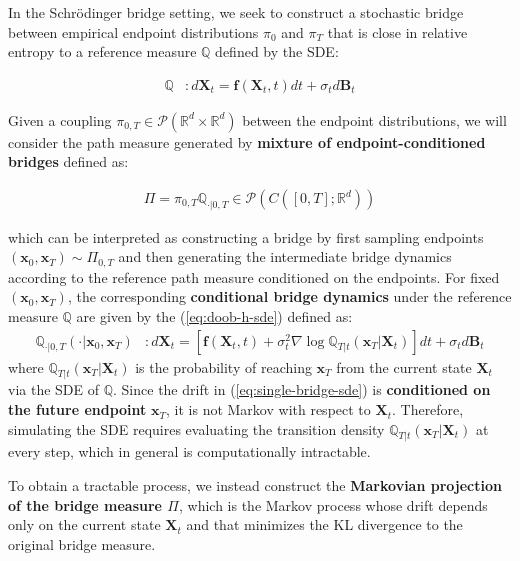 \documentclass{article}
\newcommand{\boldtext}[1]{\textbf{\textcolor{MyGreen}{#1}}}
\begin{document}
In the Schrödinger bridge setting, we seek to construct a stochastic bridge between empirical endpoint distributions $\pi_0$ and $\pi_T$ that is close in relative entropy to a reference measure $\mathbb{Q}$ defined by the SDE: 
\begin{small}
\begin{align}
    \mathbb{Q}&:d\boldsymbol{X}_t=\boldsymbol{f}(\boldsymbol{X}_t,t)dt+\sigma_td\boldsymbol{B}_t\label{eq:single-bridge-ref-sde}\tag{Reference SDE}
\end{align}
\end{small}
Given a coupling $\pi_{0,T}\in \mathcal{P}(\mathbb{R}^d\times\mathbb{R}^d)$ between the endpoint distributions, we will consider the path measure generated by \boldtext{mixture of endpoint-conditioned bridges} defined as: 
\begin{small}
\begin{align}
    \Pi=\pi_{0,T}\mathbb{Q}_{\cdot|0,T}\in \mathcal{P}(C([0,T];\mathbb{R}^d))\tag{Mixture of Bridges}
\end{align}
\end{small}
which can be interpreted as constructing a bridge by first sampling endpoints $(\boldsymbol{x}_0, \boldsymbol{x}_T) \sim \Pi_{0,T}$ and then generating the intermediate bridge dynamics according to the reference path measure conditioned on the endpoints. For fixed $(\boldsymbol{x}_0, \boldsymbol{x}_T)$, the corresponding \textbf{conditional bridge dynamics} under the reference measure $\mathbb{Q}$ are given by the (\ref{eq:doob-h-sde}) defined as:
\begin{align}
    \mathbb{Q}_{\cdot |0,T}(\cdot |\boldsymbol{x}_0, \boldsymbol{x}_T)&: d\boldsymbol{X}_t=\left[\boldsymbol{f}(\boldsymbol{X}_t,t)+\sigma^2_t\nabla \log \mathbb{Q}_{T|t}(\boldsymbol{x}_T|\boldsymbol{X}_t)\right]dt+\sigma_td\boldsymbol{B}_t\label{eq:single-bridge-sde}\tag{Bridge SDE}
\end{align}
where $\mathbb{Q}_{T|t}(\boldsymbol{x}_T|\boldsymbol{X}_t)$ is the probability of reaching $\boldsymbol{x}_T$ from the current state $\boldsymbol{X}_t$ via the SDE of $\mathbb{Q}$. Since the drift in (\ref{eq:single-bridge-sde}) is \textbf{conditioned on the future endpoint} $\boldsymbol{x}_T$, it is not Markov with respect to $\boldsymbol{X}_t$. Therefore, simulating the SDE requires evaluating the transition density $\mathbb{Q}_{T|t}(\boldsymbol{x}_T|\boldsymbol{X}_t)$ at every step, which in general is computationally intractable.

To obtain a tractable process, we instead construct the \boldtext{Markovian projection of the bridge measure $\Pi$}, which is the Markov process whose drift depends only on the current state $\boldsymbol{X}_t$ and that minimizes the KL divergence to the original bridge measure.
\end{document}
